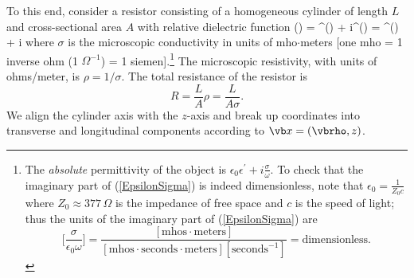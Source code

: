 \documentclass[letterpaper]{article}
\begin{document}
To this end, consider a resistor consisting of a homogeneous cylinder of
length $L$ and cross-sectional area $A$ with relative dielectric
function
{
 \epsilon(\omega)
 \quad=\quad
 \epsilon^\prime(\omega) + i\epsilon^{\prime\prime}(\omega)
 \quad=\quad
 \epsilon^\prime(\omega) + i\frac{\sigma}{\epsilon_0 \omega}
}
where $\sigma$ is the microscopic conductivity in units of
mho$\cdot$meters [one mho = 1 inverse ohm  (1 $\Omega^{-1}$) = 
1 siemen].\footnote{The \textit{absolute} permittivity
of the object is $\epsilon_0\epsilon^\prime + i\frac{\sigma}{\omega}$. 
To check that the imaginary part of (\ref{EpsilonSigma}) is indeed
dimensionless, note that $\epsilon_0=\frac{1}{Z_0 c}$ where
$Z_0\approx 377\, \Omega$ is the impedance of free space
and $c$ is the speed of light; thus the units of the imaginary
part of (\ref{EpsilonSigma}) are 
$$ \Big[\frac{\sigma}{\epsilon_0 \omega}\Big] 
   =\frac{[\text{mhos$\cdot$meters}]}
         {[\text{mhos$\cdot$seconds$\cdot$meters}][\text{seconds}^{-1}]}
   =\text{dimensionless.}
$$}
The microscopic resistivity, with units of ohms/meter, is
$\rho=1/\sigma$. The total resistance of the resistor is
$$ R=\frac{L}{A}\rho = \frac{L}{A\sigma}.$$
We align the cylinder axis with the $z$-axis and break up 
coordinates into transverse and longitudinal components according to
$\vb x=(\vbrho, z)$.
\end{document}
